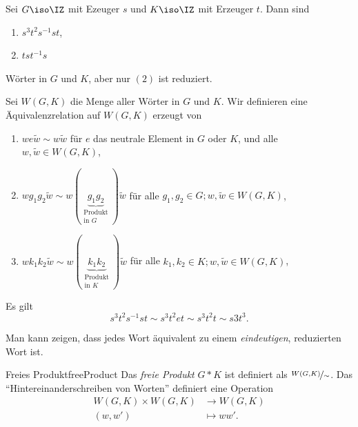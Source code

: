 \documentclass[language=ngerman]{TemplateLecture} %
\begin{document}
\begin{example}
    Sei $G \iso \IZ$ mit Ezeuger $s$ und $K \iso \IZ$ mit Erzeuger $t$. Dann sind 
    \begin{enumerate}[$(1)$]
        \item $s^3 t^2 s^{-1} s t$,
        \item $t s t^{-1} s$
    \end{enumerate}
    Wörter in $G$ und $K$, aber nur $(2)$ ist reduziert.
\end{example}

Sei $W(G, K)$ die Menge aller Wörter in $G$ und $K$. Wir definieren eine Äquivalenzrelation auf $W(G,K)$ erzeugt von 
\begin{enumerate}[$(i)$]
    \item $w e \tilde{w} \sim w \tilde{w}$ für $e$ das neutrale Element in $G$ oder $K$, und alle $w, \tilde{w} \in W(G,K)$,
    \item $w g_1 g_2 \tilde{w} \sim w (\underset{\substack{\text{Produkt} \\ \text{in $G$}}}{\underbrace{g_1 g_2}}) \tilde{w}$ für alle $g_1, g_2 \in G; w, \tilde{w} \in W(G, K)$,
    \item $w k_1 k_2 \tilde{w} \sim w (\underset{\substack{\text{Produkt} \\ \text{in $K$}}}{\underbrace{k_1 k_2}}) \tilde{w}$ für alle $k_1, k_2 \in K; w, \tilde{w} \in W(G, K)$,
\end{enumerate}

\begin{example}
    Es gilt 
    \begin{equation*}
        s^3 t^2 s^{-1} s t \sim s^3 t^2 e t \sim s^3 t^2 t \sim s3 t^3.
    \end{equation*}
\end{example}

\begin{remark}
    Man kann zeigen, dass jedes Wort äquivalent zu einem \emph{eindeutigen}, reduzierten Wort ist.
\end{remark}

\begin{defi}{Freies Produkt}{freeProduct}
    Das \emph{freie Produkt} $G * K$ ist definiert als $\nicefrac{W(G,K)}{\sim}$. Das \enquote{Hintereinanderschreiben von Worten} definiert eine Operation 
    \begin{equation*}
        \begin{split}
            W(G, K) \times W(G, K) &\longrightarrow W(G, K) \\
            (w, w') &\longmapsto w w'.
        \end{split}
    \end{equation*}
\end{defi}
\end{document}
